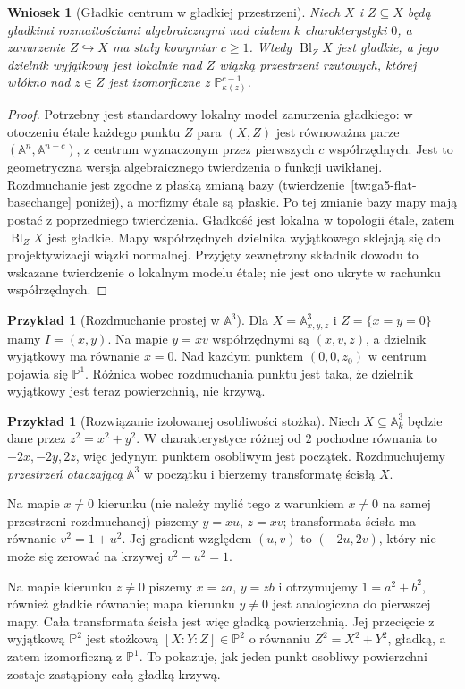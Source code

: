 \documentclass[11pt,a4paper,openany]{report}
\numberwithin{equation}{section}
\theoremstyle{plain}
\newtheorem{wniosek}[twierdzenie]{Wniosek}
\theoremstyle{definition}
\newtheorem{przyklad}[twierdzenie]{Przykład}
\theoremstyle{remark}
\newcommand{\A}{\mathbb A}
\newcommand{\PP}{\mathbb P}
\begin{document}
\begin{wniosek}[Gładkie centrum w gładkiej przestrzeni]
\label{wn:ga5-smooth-center}
Niech $X$ i $Z\subseteq X$ będą gładkimi rozmaitościami
algebraicznymi nad ciałem $k$ charakterystyki $0$,
a zanurzenie $Z\hookrightarrow X$ ma stały kowymiar $c\ge1$.
Wtedy $\operatorname{Bl}_Z X$ jest gładkie, a jego
dzielnik wyjątkowy jest lokalnie nad $Z$ wiązką
przestrzeni rzutowych, której włókno nad $z\in Z$
jest izomorficzne z $\PP^{c-1}_{\kappa(z)}$.
\end{wniosek}
\begin{proof}
Potrzebny jest standardowy lokalny model zanurzenia
gładkiego: w otoczeniu étale każdego punktu $Z$
para $(X,Z)$ jest równoważna parze
$(\A^n,\A^{n-c})$, z centrum wyznaczonym przez
pierwszych $c$ współrzędnych. Jest to geometryczna
wersja algebraicznego twierdzenia o funkcji uwikłanej.
Rozdmuchanie jest zgodne z płaską zmianą bazy
(twierdzenie~\ref{tw:ga5-flat-basechange} poniżej),
a morfizmy étale są płaskie. Po tej zmianie bazy
mapy mają postać z poprzedniego twierdzenia.
Gładkość jest lokalna w topologii étale, zatem
$\operatorname{Bl}_Z X$ jest gładkie. Mapy współrzędnych dzielnika
wyjątkowego sklejają się do projektywizacji wiązki
normalnej. Przyjęty zewnętrzny składnik dowodu to
wskazane twierdzenie o lokalnym modelu étale;
nie jest ono ukryte w rachunku współrzędnych.
\end{proof}

\begin{przyklad}[Rozdmuchanie prostej w $\A^3$]
Dla $X=\A^3_{x,y,z}$ i $Z=\{x=y=0\}$
mamy $I=(x,y)$. Na mapie $y=xv$ współrzędnymi
są $(x,v,z)$, a dzielnik wyjątkowy ma równanie
$x=0$. Nad każdym punktem $(0,0,z_0)$ w centrum
pojawia się $\PP^1$. Różnica wobec rozdmuchania
punktu jest taka, że dzielnik wyjątkowy jest teraz
powierzchnią, nie krzywą.
\end{przyklad}

\begin{przyklad}[Rozwiązanie izolowanej osobliwości stożka]
\label{prz:ga5-cone}
Niech $X\subseteq\A^3_k$ będzie dane przez
$z^2=x^2+y^2$. W charakterystyce różnej od $2$
pochodne równania to $-2x,-2y,2z$, więc jedynym
punktem osobliwym jest początek. Rozdmuchujemy
\emph{przestrzeń otaczającą} $\A^3$ w początku
i bierzemy transformatę ścisłą $X$.

Na mapie $x\ne0$ kierunku (nie należy mylić tego
z warunkiem $x\ne0$ na samej przestrzeni rozdmuchanej)
piszemy $y=xu$, $z=xv$; transformata ścisła ma
równanie $v^2=1+u^2$. Jej gradient względem
$(u,v)$ to $(-2u,2v)$, który nie może się zerować
na krzywej $v^2-u^2=1$.

Na mapie kierunku $z\ne0$ piszemy
$x=za$, $y=zb$ i otrzymujemy $1=a^2+b^2$,
również gładkie równanie; mapa kierunku $y\ne0$
jest analogiczna do pierwszej mapy. Cała transformata
ścisła jest więc gładką powierzchnią.
Jej przecięcie z wyjątkową $\PP^2$ jest stożkową
$[X:Y:Z]\in\PP^2$ o równaniu $Z^2=X^2+Y^2$,
gładką, a zatem izomorficzną z $\PP^1$.
To pokazuje, jak jeden punkt osobliwy powierzchni
zostaje zastąpiony całą gładką krzywą.
\end{przyklad}
\end{document}
